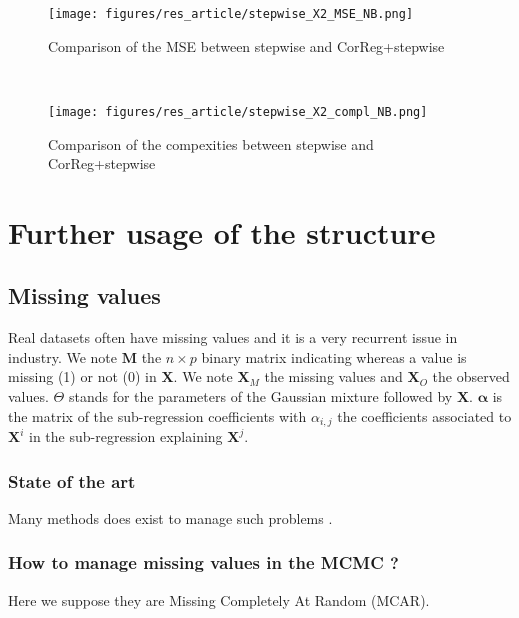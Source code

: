 \documentclass[11pt,a4paper]{report}
\begin{document}
 \begin{figure}[h!]
	\begin{minipage}[l]{.48\linewidth}
			\texttt{[image: figures/res\_article/stepwise\_X2\_MSE\_NB.png]} 
			\caption{Comparison of the MSE between stepwise and CorReg+stepwise}
	\end{minipage} \
   \begin{minipage}[r]{.48\linewidth}
			\texttt{[image: figures/res\_article/stepwise\_X2\_compl\_NB.png]} 
			\caption{Comparison of the compexities between stepwise and CorReg+stepwise}
   \end{minipage}
\end{figure}



\part{Further usage of the structure}	
\chapter{Missing values}
	Real datasets often have missing values and it is a very recurrent issue in industry. We note $\boldsymbol{M}$ the $n\times p$ binary matrix indicating whereas a value is missing (1) or not (0) in $\boldsymbol{X}$.
	We note $\boldsymbol{X}_M$ the missing values and $\boldsymbol{X}_{O}$ the observed values. $\Theta$ stands for the parameters of the Gaussian mixture followed by $\boldsymbol{X}$.
	$\boldsymbol{\alpha}$ is the matrix of the sub-regression coefficients with $\alpha_{i,j}$ the coefficients associated to $\boldsymbol{X}^i$ in the sub-regression explaining $\boldsymbol{X}^j$.
	
	\section{State of the art}	
	 Many methods does exist to manage such problems \cite{little1992regression}. 	
	\section{How to manage missing values in the MCMC ?}
		Here we suppose they are Missing Completely At Random (MCAR). 
	
\end{document}
